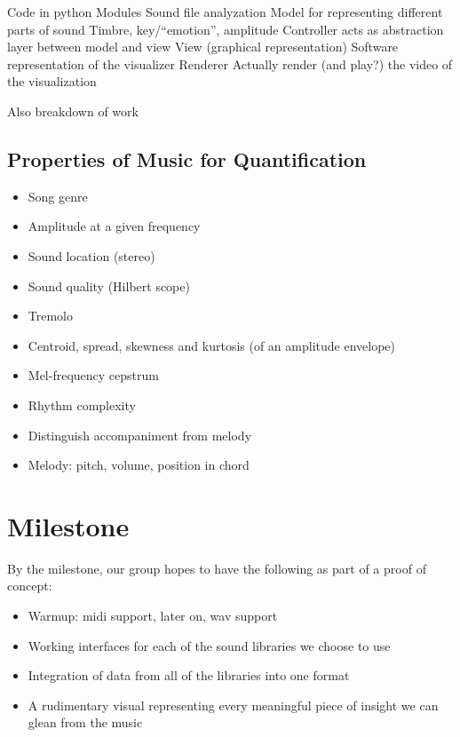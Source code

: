 \documentclass{article}
\begin{document}
Code in python
Modules
Sound file analyzation
Model for representing different parts of sound
Timbre, key/``emotion'', amplitude
Controller acts as abstraction layer between model and view
View (graphical representation)
Software representation of the visualizer
Renderer
Actually render (and play?) the video of the visualization

Also breakdown of work

\subsection{Properties of Music for Quantification}

\begin{itemize}
	\item Song genre
	\item Amplitude at a given frequency
	\item Sound location (stereo)
	\item Sound quality (Hilbert scope)
	\item Tremolo
	\item Centroid, spread, skewness and kurtosis (of an amplitude envelope)
	\item Mel-frequency cepstrum
	\item Rhythm complexity
	\item Distinguish accompaniment from melody
	\item Melody: pitch, volume, position in chord
\end{itemize}

\section{Milestone}

By the milestone, our group hopes to have the following as part of a proof of concept:

\begin{itemize}
	\item Warmup: midi support, later on, wav support
	\item Working interfaces for each of the sound libraries we choose to use
	\item Integration of data from all of the libraries into one format
	\item A rudimentary visual representing every meaningful piece of insight we can glean from the music
\end{itemize}
\end{document}
